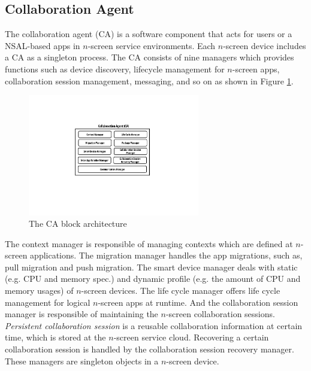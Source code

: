 \documentclass[conference]{IEEEtran}
\begin{document}
\subsection{Collaboration Agent}
The collaboration agent (CA) is a software component that acts for users or a NSAL-based apps in $n$-screen service environments.  
Each $n$-screen device includes a CA as a singleton process.
The CA consists of nine managers which provides functions such as device discovery, lifecycle management for $n$-screen apps, collaboration session management, messaging, and so on as shown in Figure \ref{fig:collaborationagent}. 
    \begin{figure}[htb] %
    \centering
    \includegraphics[width=7.5cm,keepaspectratio]{collaborationagent}
    \caption{The CA block architecture}
    \label{fig:collaborationagent}
    \end{figure}

The context manager is responsible of managing contexts which are defined at $n$-screen applications. The migration manager handles the app migrations, such as, pull migration and push migration. 
The smart device manager deals with static (e.g. CPU and memory spec.) and dynamic profile (e.g. the amount of CPU and memory usages) of $n$-screen devices.
The life cycle manager offers life cycle management for logical $n$-screen apps at runtime.
And the collaboration session manager is responsible of maintaining the $n$-screen collaboration sessions.
\textit{Persistent collaboration session} is a reusable collaboration information at certain time, which is stored at the $n$-screen service cloud.
Recovering a certain collaboration session is handled by the collaboration session recovery manager.
These managers are singleton objects in a $n$-screen device.
\end{document}
